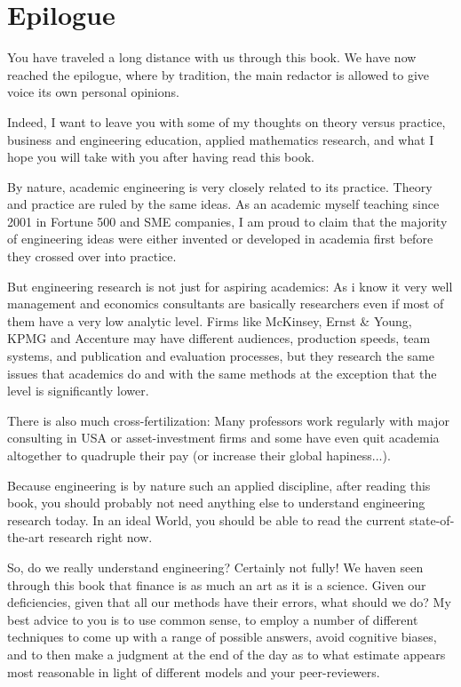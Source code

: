 \documentclass[12pt,a4paper,twoside,openright]{report}
\newcounter{def}
\theoremstyle{definition}
\theoremstyle{itexmp}
\numberwithin{equation}{section}
\begin{document}
	
	
 	\chapter{Epilogue}
	You have traveled a long distance with us through this book. We have now reached the epilogue, where by tradition, the main redactor is allowed to give voice its own personal opinions. 

	Indeed, I want to leave you with some of my thoughts on theory versus practice, business and engineering education, applied mathematics research, and what I hope you will take with you after having read this book.
	
	By nature, academic engineering is very closely related to its practice. Theory and practice are ruled by the same ideas. As an academic myself teaching since 2001 in Fortune 500 and SME companies, I am proud to claim that the majority of engineering ideas were either invented or developed in academia first before they crossed over into practice.
	
	But engineering research is not just for aspiring academics: As i know it very well management and economics consultants are basically researchers even if most of them have a very low analytic level. Firms like McKinsey, Ernst \& Young, KPMG and Accenture may have different audiences, production speeds, team systems, and publication and evaluation processes, but they research the same issues that academics do and with the same methods at the exception that the level is significantly lower.

	There is also much cross-fertilization: Many professors work regularly with major consulting in USA or asset-investment firms and some have even quit academia altogether to quadruple their pay (or increase their global hapiness...).

	Because engineering is by nature such an applied discipline, after reading this book, you should probably not need anything else to understand engineering research today. In an ideal World, you should be able to read the current state-of-the-art research right now.
	
	So, do we really understand engineering? Certainly not fully! We haven seen through this book that finance is as much an art as it is a science. Given our deficiencies, given that all our methods have their errors, what should we do? My best advice to you is to use common sense, to employ a number of different techniques to come up with a range of possible answers, avoid cognitive biases, and to then make a judgment at the end of the day as to what estimate appears most reasonable in light of different models and your peer-reviewers.
	
\end{document}

